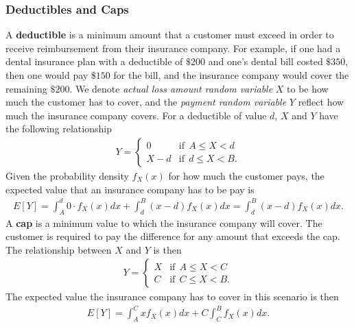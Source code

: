 \documentclass{article}
\numberwithin{theorem}{subsection}
\numberwithin{theorem}{subsubsection}
\numberwithin{lemma}{subsection}
\numberwithin{lemma}{subsubsection}
\theoremstyle{definition}
\numberwithin{definition}{subsection}
\numberwithin{definition}{subsubsection}
\begin{document}
\subsubsection{Deductibles and Caps}
A \textbf{deductible} is a minimum amount that a customer must exceed in order to receive reimbursement from their insurance company. For example, if one had a dental insurance plan with a deductible of $\$200$ and one's dental bill costed $\$350$, then one would pay $\$150$ for the bill, and the insurance company would cover the remaining $\$200$. We denote \textit{actual loss amount random variable} $X$ to be how much the customer has to cover, and the \textit{payment random variable} $Y$ reflect how much the insurance company covers. For a deductible of value $d$, $X$ and $Y$ have the following relationship
\begin{gather}
    Y = \begin{cases}
            0 & \text{if}\ \ A \leq X < d\\
            X - d & \text{if}\ \  d \leq X < B.
        \end{cases}
\end{gather}
Given the probability density $f_{X}(x)$ for how much the customer pays, the expected value that an insurance company has to be pay is
\begin{gather}
    E[Y] = \int_{A}^{d}0\cdot f_{X}(x)dx + \int_{d}^{B}(x-d)f_{X}(x)dx = \int_{d}^{B}(x-d)f_{X}(x)dx.
\end{gather}
A \textbf{cap} is a minimum value to which the insurance company will cover. The customer is required to pay the difference for any amount that exceeds the cap. The relationship between $X$ and $Y$ is then
\begin{gather}
    Y = \begin{cases}
            X & \text{if}\ \ A \leq X < C\\
            C & \text{if}\ \ C \leq X < B.
        \end{cases}
\end{gather}
The expected value the insurance company has to cover in this scenario is then
\begin{gather}
    E[Y] = \int_{A}^{C}xf_{X}(x)dx + C\int_{C}^{B}f_{X}(x)dx.
\end{gather}
\end{document}
